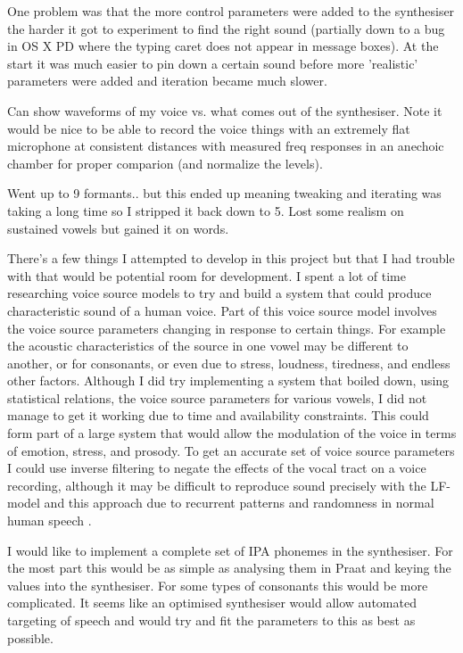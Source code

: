 One problem was that the more control parameters were added to the synthesiser the harder it got to experiment to find the right sound (partially down to a bug in OS X PD where the typing caret does not appear in message boxes). At the start it was much easier to pin down a certain sound before more 'realistic' parameters were added and iteration became much slower.

Can show waveforms of my voice vs. what comes out of the synthesiser. Note it would be nice to be able to record the voice things with an extremely flat microphone at consistent distances with measured freq responses in an anechoic chamber for proper comparion (and normalize the levels).

Went up to 9 formants.. but this ended up meaning tweaking and iterating was taking a long time so I stripped it back down to 5. Lost some realism on sustained vowels but gained it on words.

There's a few things I attempted to develop in this project but that I had trouble with that would be potential room for development. I spent a lot of time researching voice source models to try and build a system that could produce characteristic sound of a human voice. Part of this voice source model involves the voice source parameters changing in response to certain things. For example the acoustic characteristics of the source in one vowel may be different to another, or for consonants, or even due to stress, loudness, tiredness, and endless other factors. Although I did try implementing a system that boiled down, using statistical relations, the voice source parameters for various vowels, I did not manage to get it working due to time and availability constraints. 
This could form part of a large system that would allow the modulation of the voice in terms of emotion, stress, and prosody.
To get an accurate set of voice source parameters I could use inverse filtering to negate the effects of the vocal tract on a voice recording, although it may be difficult to reproduce sound precisely with the LF-model and this approach due to recurrent patterns and randomness in normal human speech \cite{Fant1995}.

I would like to implement a complete set of IPA phonemes in the synthesiser. For the most part this would be as simple as analysing them in Praat and keying the values into the synthesiser. For some types of consonants this would be more complicated. It seems like an optimised synthesiser would allow automated targeting of speech and would try and fit the parameters to this as best as possible.

